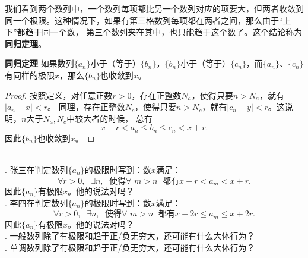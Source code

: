 \documentclass[12pt,UTF8]{ctexbook}
\begin{document}
我们看到两个数列中，一个数列每项都比另一个数列对应的项要大，但两者收敛到同一个极限。这种情况下，如果有第三格数列每项都在两者之间，那么由于“上下”都趋于同一个数，
第三个数列夹在其中，也只能趋于这个数了。这个结论称为\textbf{同归定理}。
\begin{tm}{\textbf{同归定理}}\label{tm:a-0-48}
    如果数列$\{a_n\}$小于（等于）$\{b_n\}$，$\{b_n\}$小于（等于）$\{c_n\}$，而$\{a_n\}$、$\{c_n\}$有同样的极限$x$，那么$\{b_n\}$也收敛到$x$。
\end{tm}
\begin{proof}
    按照定义，对任意正数$r>0$，存在正整数$N_a$，使得只要$n>N_a$，就有$|a_n - x| < r$。
    同理，存在正整数$N_c$，使得只要$n>N_c$，就有$|c_n - y| < r$。这说明，$n$大于$N_a,N_c$中较大者的时候，
    总有
    $$ x - r < a_n \leqslant b_n \leqslant c_n < x + r. $$
    因此$\{b_n\}$也收敛到$x$。
\end{proof}

\begin{sk}
    \mbox{} \\
    . 张三在判定数列$\{a_n\}$的极限时写到：数$x$满足：
    $$ \forall r > 0, \;\,\, \exists n,  \;\,\, \mbox{使得} \forall \,\, m > n \;\,\, \mbox{都有} x - r < a_m < x + r. $$
    \indent 因此$\{a_n\}$有极限$x$。他的说法对吗？\\
    . 李四在判定数列$\{a_n\}$的极限时写到：数$x$满足：
    $$ \forall r > 0, \;\,\, \exists n,  \;\,\, \mbox{使得} \forall \,\, m > n \;\,\, \mbox{都有} x - 2r \leqslant a_m \leqslant x + 2r. $$
    \indent 因此$\{a_n\}$有极限$x$。他的说法对吗？\\
    . 一般数列除了有极限和趋于正/负无穷大，还可能有什么大体行为？\\
    . 单调数列除了有极限和趋于正/负无穷大，还可能有什么大体行为？
\end{sk}
\end{document}
